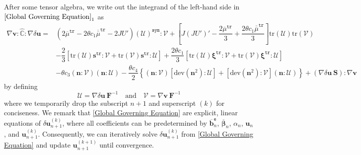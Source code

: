 \documentclass[preprint,11pt]{elsarticle}
\theoremstyle{definition}
\begin{document}
After some tensor algebra, we write out the integrand of the left-hand side in $\eqref{Global Governing Equation}_1$ as
\begin{equation} \label{Integrand of Left-hand Side}
    \begin{array}{ll}
        \nabla \mathbf{v} : \widehat{\mathbb{C}} : \nabla \delta \mathbf{u} = &\left( 2 \overline{\mu}^{\texttt{tr}} - 2 \theta c_1 \overline{\overline{\mu}}^{\texttt{tr}} - 2 J U' \right) \left( \mathcal{U} \right)^\texttt{sym} : \mathcal{V}
        
        + \left[ J \left( J U' \right)' - \dfrac{2 \overline{\mu}^{\texttt{tr}}}{3} + \dfrac{2 \theta c_1 \overline{\overline{\mu}}^{\texttt{tr}}}{3} \right] \text{tr} \left( \mathcal{U} \right) \text{tr} \left( \mathcal{V} \right) \\[12pt]
        
        &- \dfrac{2}{3} \left[ \text{tr} \left( \mathcal{U} \right) \mathbf{s}^{\texttt{tr}} : \mathcal{V} + \text{tr} \left( \mathcal{V} \right) \mathbf{s}^{\texttt{tr}} : \mathcal{U} \right]

        + \dfrac{2 \theta c_1}{3} \left[ \text{tr} \left( \mathcal{U} \right) \boldsymbol{\xi}^{\texttt{tr}} : \mathcal{V} + \text{tr} \left( \mathcal{V} \right) \boldsymbol{\xi}^{\texttt{tr}} : \mathcal{U} \right] \\[12pt]

        &- \theta c_3 \left( \mathbf{n} : \mathcal{V} \right) \left( \mathbf{n} : \mathcal{U} \right)

        - \dfrac{\theta c_4}{2} \left\{ \left( \mathbf{n} : \mathcal{V} \right) \left[ \text{dev} \left( \mathbf{n}^2 \right) : \mathcal{U} \right] + \left[ \text{dev} \left( \mathbf{n}^2 \right) : \mathcal{V} \right] \left( \mathbf{n} : \mathcal{U} \right) \right\}

        + \left( \nabla \delta \mathbf{u}\ \mathbf{S} \right) : \nabla \mathbf{v}
    \end{array}
\end{equation}
by defining
\begin{equation*}
    \mathcal{U} = \nabla \delta \mathbf{u}\ \mathbf{F}^{-1}
    \quad \text{and} \quad
    \mathcal{V} = \nabla \mathbf{v}\ \mathbf{F}^{-1}
\end{equation*}
where we temporarily drop the subscript $n+1$ and superscript $(k)$ for conciseness. We remark that \eqref{Global Governing Equation} are explicit, linear equations of $\delta \mathbf{u}_{n+1}^{(k)}$, where all coefficients can be predetermined by $\overline{\mathbf{b}}_n^\texttt{e}$, $\overline{\boldsymbol{\beta}}_n$, $\alpha_n$, $\mathbf{u}_n$, and $\mathbf{u}_{n+1}^{(k)}$. Consequently, we can iteratively solve $\delta \mathbf{u}_{n+1}^{(k)}$ from \eqref{Global Governing Equation} and update $\mathbf{u}_{n+1}^{(k+1)}$ until convergence.
\end{document}
